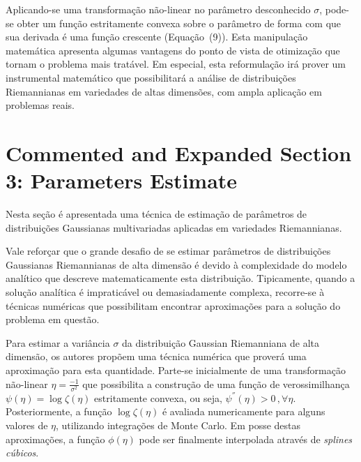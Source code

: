\documentclass[a4paper,titlepage]{article}
\begin{document}
Aplicando-se uma transformação não-linear no parâmetro desconhecido $\sigma$,
pode-se obter um função estritamente convexa sobre o parâmetro de forma com que
sua derivada é uma função crescente (Equação~(9)). Esta manipulação matemática
apresenta algumas vantagens do ponto de vista de otimização que tornam o
problema mais tratável. Em especial, esta reformulação irá prover um
instrumental matemático que possibilitará a análise de distribuições
Riemannianas em variedades de altas dimensões, com ampla aplicação em problemas
reais.

\section{Commented and Expanded Section 3: Parameters Estimate}
Nesta seção é apresentada uma técnica de estimação de parâmetros de
distribuições Gaussianas multivariadas aplicadas em variedades Riemannianas.

\begin{center}
  \vspace{1em}
  \vspace{1em}
\end{center}

Vale reforçar que o grande desafio de se estimar parâmetros de distribuições
Gaussianas Riemannianas de alta dimensão é devido à complexidade do modelo
analítico que descreve matematicamente esta distribuição. Tipicamente, quando
a solução analítica é impraticável ou demasiadamente complexa, recorre-se à
técnicas numéricas que possibilitam encontrar aproximações para a solução do
problema em questão.

Para estimar a variância $\sigma$ da distribuição Gaussian Riemanniana de alta
dimensão, os autores propõem uma técnica numérica que proverá uma aproximação
para esta quantidade. Parte-se inicialmente de uma transformação não-linear
$\eta = \frac{-1}{\sigma^2}$ que possibilita a construção de uma função de
verossimilhança $\psi(\eta) = \log \zeta(\eta)$ estritamente convexa, ou seja,
$\psi^{''}(\eta) > 0\,, \forall \eta$. Posteriormente, a função
$\log \zeta(\eta)$ é avaliada numericamente para alguns valores de $\eta$,
utilizando integrações de Monte Carlo. Em posse destas aproximações, a função
$\phi(\eta)$ pode ser finalmente interpolada através de \textit{splines cúbicos}. 
\end{document}
